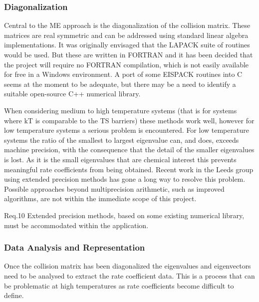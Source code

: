 \subsubsection{Diagonalization}\label{sec:Diagonalization}


Central to the ME approach is the diagonalization of the collision matrix. These matrices are real symmetric and can be addressed using standard linear algebra implementations. It was originally envisaged that the LAPACK suite of routines would be used. But these are written in FORTRAN and it has been decided that the project will require no FORTRAN compilation, which is not easily available for free in a Windows environment. A port of some EISPACK routines into C seems at the moment to be adequate, but there may be a need to identify a suitable open-source C++ numerical library.

When considering medium to high temperature systems (that is for systems where kT is comparable to the TS barriers) these methods work well, however for low temperature systems a serious problem is encountered. For low temperature systems the ratio of the smallest to largest eigenvalue can, and does, exceeds machine precision, with the consequence that the detail of the smaller eigenvalues is lost. As it is the small eigenvalues that are chemical interest this prevents meaningful rate coefficients from being obtained. Recent work in the Leeds group using extended precision methods has gone a long way to resolve this problem. Possible approaches beyond multiprecision arithmetic, such as improved algorithms, are not within the immediate scope of this project. 

Req.10 Extended precision methods, based on some existing numerical library, must be accommodated within the application.

\subsubsection{Data Analysis and Representation
}\label{sec:DataAnalysisAndRepresentation
}

Once the collision matrix has been diagonalized the eigenvalues and eigenvectors need to be analysed to extract the rate coefficient data. This is a process that can be problematic at high temperatures as rate coefficients become difficult to define.

